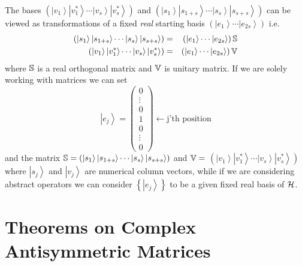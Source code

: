 The bases $\left( \left\vert v_{1}\right\rangle \left\vert v_{1}^{\ast
}\right\rangle \cdots \left\vert v_{s}\right\rangle \left\vert v_{s}^{\ast
}\right\rangle \right) $ and $\left( \left\vert s_{1}\right\rangle
\left\vert s_{1+s}\right\rangle \cdots \left\vert s_{s}\right\rangle
\left\vert s_{s+s}\right\rangle \right) $ can be viewed as transformations
of a fixed {\em real }starting basis $\left( \left\vert e_{1}\right\rangle
\cdots \left\vert e_{2s}\right\rangle \right) $ i.e.%
\begin{eqnarray}
\left( \left\vert s_{1}\right\rangle \left\vert s_{1+s}\right\rangle \cdots
\left\vert s_{s}\right\rangle \left\vert s_{s+s}\right\rangle \right)
&=&\left( \left\vert e_{1}\right\rangle \cdots \left\vert
e_{2s}\right\rangle \right) {\Bbb S}  \nonumber \\
\left( \left\vert v_{1}\right\rangle \left\vert v_{1}^{\ast }\right\rangle
\cdots \left\vert v_{s}\right\rangle \left\vert v_{s}^{\ast }\right\rangle
\right) &=&\left( \left\vert e_{1}\right\rangle \cdots \left\vert
e_{2s}\right\rangle \right) {\Bbb V}
\end{eqnarray}%
where ${\Bbb S}$ is a real orthogonal matrix and ${\Bbb V}$ is unitary
matrix. If we are solely working with matrices we can set 
\begin{equation}
\left\vert e_{j}\right\rangle =\left( 
\begin{array}{c}
0 \\ 
\vdots \\ 
0 \\ 
1 \\ 
0 \\ 
\vdots \\ 
0%
\end{array}%
\right) \leftarrow \text{j'th position}
\end{equation}%
and the matrix ${\Bbb S}=\left( \left\vert s_{1}\right\rangle \left\vert
s_{1+s}\right\rangle \cdots \left\vert s_{s}\right\rangle \left\vert
s_{s+s}\right\rangle \right) $ and ${\Bbb V}=$ $\left( \left\vert
v_{1}\right\rangle \left\vert v_{1}^{\ast }\right\rangle \cdots \left\vert
v_{s}\right\rangle \left\vert v_{s}^{\ast }\right\rangle \right) $ where $%
\left\vert s_{j}\right\rangle $ and $\left\vert v_{j}\right\rangle $ are
numerical column vectors, while if we are considering abstract operators we
can consider $\left\{ \left\vert e_{j}\right\rangle \right\} $ to be a given
fixed real basis of ${\cal H}$.

\section{Theorems on Complex Antisymmetric Matrices}


